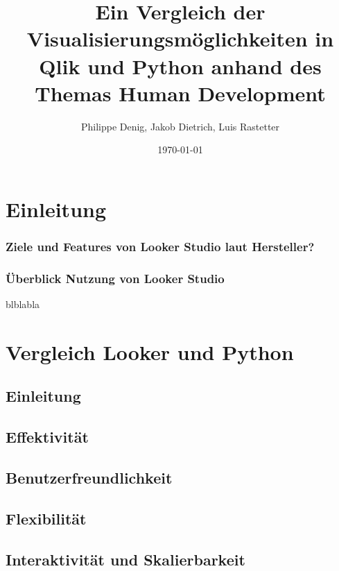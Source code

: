 \documentclass[12pt]{article}
\begin{document}
	\title{Ein Vergleich der Visualisierungsmöglichkeiten in Qlik und Python anhand des Themas Human Development}
	\author{Philippe Denig, Jakob Dietrich, Luis Rastetter}
	\date{\today}
	
	\maketitle
	
	\newpage
	
	\tableofcontents
	
	\newpage
	
	\section{Einleitung}
	
	\subsubsection{Ziele und Features von Looker Studio laut Hersteller?}
	
	\subsubsection{Überblick Nutzung von Looker Studio}
	blblabla
	
	\section{Vergleich Looker und Python}
	\subsection{Einleitung}
	
	\subsection{Effektivität}
	
	\subsection{Benutzerfreundlichkeit}
	
	\subsection{Flexibilität}

	\subsection{Interaktivität und Skalierbarkeit}
 
\end{document}
